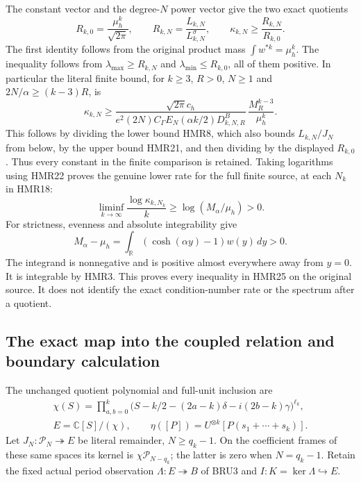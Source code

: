 The constant vector and the degree-$N$ power vector give
the two exact quotients
\[
 R_{k,0}=\frac{\mu_h^k}{\sqrt{2\pi}},\qquad
 R_{k,N}=\frac{L_{k,N}}{L^\sigma_{k,N}},\qquad
 \kappa_{k,N}\geq\frac{R_{k,N}}{R_{k,0}}.
 \tag{HMR24}
\]
The first identity follows from the original product mass
$\int w^{*k}=\mu_h^k$. The inequality follows from
$\lambda_{\max}\geq R_{k,N}$ and
$\lambda_{\min}\leq R_{k,0}$, all of them positive.
In particular the literal finite bound, for $k\geq3$,
$R>0$, $N\geq1$ and $2N/\alpha\geq(k-3)R$, is
\[
 \boxed{\displaystyle
 \kappa_{k,N}\geq
 \frac{\sqrt{2\pi}c_h}
 {e^2(2N)C_\Gamma E_N(\alpha k/2)D_{k,N,R}^{B}}\,
 \frac{M_R^{k-3}}{\mu_h^k}.}
 \tag{HMR24a}
\]
This follows by dividing the lower bound HMR8,
which also bounds $L_{k,N}/J_N$ from below,
by the upper bound HMR21, and then dividing by
the displayed $R_{k,0}$. Thus every constant
in the finite comparison is retained.
Taking logarithms using HMR22 proves the genuine lower
rate for the full finite source, at each $N_k$ in HMR18:
\[
 \boxed{\displaystyle
 \liminf_{k\to\infty}\frac{\log\kappa_{k,N_k}}{k}
 \geq \log(M_\alpha/\mu_h)>0.}
 \tag{HMR25}
\]
For strictness, evenness and absolute integrability give
\[
 M_\alpha-\mu_h
 =\int_{\mathbb R}(\cosh(\alpha y)-1)w(y)\,dy>0.
 \tag{HMR26}
\]
The integrand is nonnegative and is positive almost
everywhere away from $y=0$. It is integrable by HMR3.
This proves every inequality in HMR25 on the original
source. It does not identify the exact condition-number
rate or the spectrum after a quotient.

\subsection{The exact map into the coupled relation and boundary calculation}

The unchanged quotient polynomial and full-unit inclusion are
\[
 \begin{gathered}
 \chi(S)=\prod_{a,b=0}^k
 \bigl(S-k/2-(2a-k)\delta-i(2b-k)\gamma\bigr)^{\ell_k},\\
 E=\mathbb C[S]/(\chi),\qquad
 \eta([P])=U^{\otimes k}[P(s_1+\cdots+s_k)].
 \end{gathered}\tag{HMR27}
\]
Let $J_N:\mathcal P_N\twoheadrightarrow E$ be literal
remainder, $N\geq q_k-1$. On the coefficient frames
of these same spaces its kernel is
$\chi\mathcal P_{N-q_k}$; the latter is zero when
$N=q_k-1$. Retain the fixed actual period observation
$\Lambda:E\twoheadrightarrow B$ of BRU3 and
$I:K=\ker\Lambda\hookrightarrow E$.

